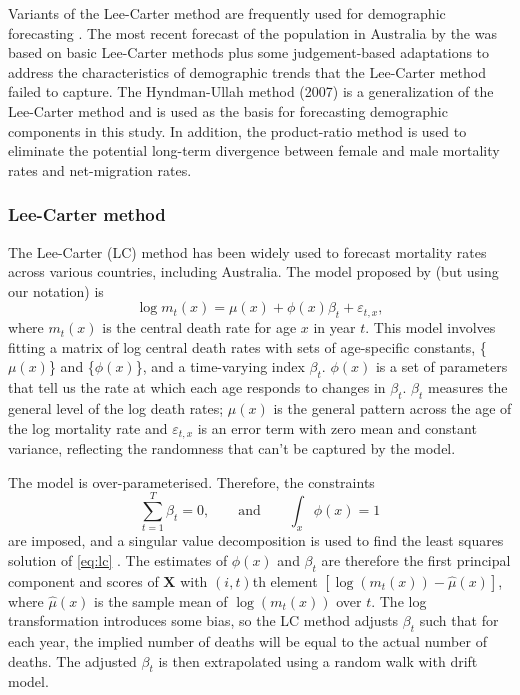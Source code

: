 \documentclass[11pt,a4paper,]{article}
\begin{document}
Variants of the Lee-Carter method \autocite{LC92} are frequently used for demographic forecasting \autocite[see, e.g.,][]{SBH11}. The most recent forecast of the population in Australia by the \textcite{PC13} was based on basic Lee-Carter methods plus some judgement-based adaptations to address the characteristics of demographic trends that the Lee-Carter method failed to capture. The Hyndman-Ullah method (2007) is a generalization of the Lee-Carter method and is used as the basis for forecasting demographic components in this study. In addition, the product-ratio method \autocite{HBY13} is used to eliminate the potential long-term divergence between female and male mortality rates and net-migration rates.

\hypertarget{lee-carter-method}{%
\subsubsection*{Lee-Carter method}\label{lee-carter-method}}

The Lee-Carter (LC) method has been widely used to forecast mortality rates across various countries, including Australia. The model proposed by \textcite{LC92} (but using our notation) is
\begin{equation}\label{eq:lc}
  \log m_{t}(x)=\mu(x)+\phi(x)\beta_{t}+\varepsilon_{t,x},
\end{equation}
where \(m_{t}(x)\) is the central death rate for age \(x\) in year \(t\). This model involves fitting a matrix of log central death rates with sets of age-specific constants, \{\(\mu(x)\)\} and \{\(\phi(x)\)\}, and a time-varying index \(\beta_{t}\). \(\phi(x)\) is a set of parameters that tell us the rate at which each age responds to changes in \(\beta_{t}\). \(\beta_{t}\) measures the general level of the log death rates; \(\mu(x)\) is the general pattern across the age of the log mortality rate and \(\varepsilon_{t,x}\) is an error term with zero mean and constant variance, reflecting the randomness that can't be captured by the model.

The model is over-parameterised. Therefore, the constraints
\begin{equation}
  \sum_{t=1}^{T}\beta_t=0, \qquad\text{and}\qquad \int_x \phi(x)=1
\end{equation}
are imposed, and a singular value decomposition is used to find the least squares solution of \eqref{eq:lc} \autocite{Good1969}. The estimates of \(\phi(x)\) and \(\beta_t\) are therefore the first principal component and scores of \(\bm{X}\) with \((i,t)\)th element \([\log(m_{t}(x))-\widehat\mu(x)]\), where \(\widehat\mu(x)\) is the sample mean of \(\log(m_{t}(x))\) over \(t\). The log transformation introduces some bias, so the LC method adjusts \(\beta_t\) such that for each year, the implied number of deaths will be equal to the actual number of deaths. The adjusted \(\beta_t\) is then extrapolated using a random walk with drift model.
\end{document}
